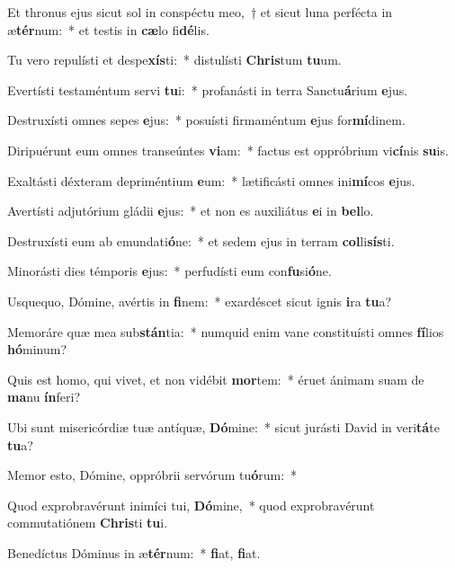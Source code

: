 \item Et thronus ejus sicut sol in conspéctu meo,~† et sicut luna perfécta in æ\textbf{tér}num:~* et testis in \textbf{cæ}lo fi\textbf{dé}lis.
\item Tu vero repulísti et despe\textbf{xís}ti:~* distulísti \textbf{Chris}tum \textbf{tu}um.
\item Evertísti testaméntum servi \textbf{tu}i:~* profanásti in terra Sanctu\textbf{á}rium \textbf{e}jus.
\item Destruxísti omnes sepes \textbf{e}jus:~* posuísti firmaméntum \textbf{e}jus for\textbf{mí}dinem.
\item Diripuérunt eum omnes transeúntes \textbf{vi}am:~* factus est oppróbrium vi\textbf{cí}nis \textbf{su}is.
\item Exaltásti déxteram depriméntium \textbf{e}um:~* lætificásti omnes ini\textbf{mí}cos \textbf{e}jus.
\item Avertísti adjutórium gládii \textbf{e}jus:~* et non es auxiliátus \textbf{e}i in \textbf{bel}lo.
\item Destruxísti eum ab emundati\textbf{ó}ne:~* et sedem ejus in terram \textbf{col}li\textbf{sís}ti.
\item Minorásti dies témporis \textbf{e}jus:~* perfudísti eum con\textbf{fu}si\textbf{ó}ne.
\item Usquequo, Dómine, avértis in \textbf{fi}nem:~* exardéscet sicut ignis \textbf{i}ra \textbf{tu}a?
\item Memoráre quæ mea sub\textbf{stán}tia:~* numquid enim vane constituísti omnes \textbf{fí}lios \textbf{hó}minum?
\item Quis est homo, qui vivet, et non vidébit \textbf{mor}tem:~* éruet ánimam suam de \textbf{ma}nu \textbf{ín}feri?
\item Ubi sunt misericórdiæ tuæ antíquæ, \textbf{Dó}mine:~* sicut jurásti David in veri\textbf{tá}te \textbf{tu}a?
\item Memor esto, Dómine, oppróbrii servórum tu\textbf{ó}rum:~* 
\item Quod exprobravérunt inimíci tui, \textbf{Dó}mine,~* quod exprobravérunt commutatiónem \textbf{Chris}ti \textbf{tu}i.
\item Benedíctus Dóminus in æ\textbf{tér}num:~* \textbf{fi}at, \textbf{fi}at.
